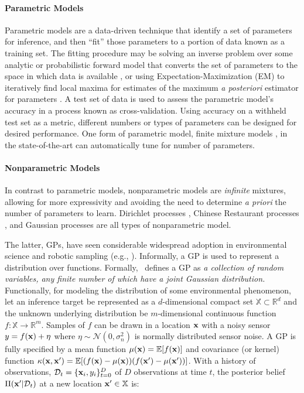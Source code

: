 \paragraph{Parametric Models}
Parametric models are a data-driven technique that identify a set of parameters for inference, and then ``fit'' those parameters to a portion of data known as a training set. The fitting procedure may be solving an inverse problem over some analytic or probabilistic forward model that converts the set of parameters to the space in which data is available \autocite{puonti2016fast}, or using Expectation-Maximization (EM) to iteratively find local maxima for estimates of the maximum \emph{a posteriori} estimator for parameters \autocite{moon1996expectation}. A test set of data is used to assess the parametric model's accuracy in a process known as cross-validation. Using accuracy on a withheld test set as a metric, different numbers or types of parameters can be designed for desired performance. One form of parametric model, finite mixture models \autocite{figueiredo2002unsupervised}, in the state-of-the-art can automatically tune for number of parameters.

\paragraph{Nonparametric Models}
In contrast to parametric models, nonparametric models are \emph{infinite} mixtures, allowing for more expressivity and avoiding the need to determine \emph{a priori} the number of parameters to learn. Dirichlet processes \autocite{ferguson1973bayesian}, Chinese Restaurant processes \autocite{griffiths2003hierarchical}, and Gaussian processes \autocite{Rasmussen2004} are all types of nonparametric model. 

The latter, GPs, have seen considerable widespread adoption in environmental science and robotic sampling (e.g., \cite{Srinivas2012,Krause2008,ouyang2014multi,kleiber2012daily,cahill2015modeling,wan2017reduced, ma2017informative, Marchant2014a,flaspohler2019information,luo2018adaptive,guestrin2005near}). Informally, a GP is used to represent a distribution over functions. Formally,~\cite{Rasmussen2004} defines a GP as \emph{a collection of random variables, any finite number of which have a joint Gaussian distribution.} Functionally, for modeling the distribution of some environmental phenomenon, let an inference target be represented as a $d$-dimensional compact set $\mathbb{X} \subset \mathbb{R}^d$ and the unknown underlying distribution be $m$-dimensional continuous function $f : \mathbb{X} \longrightarrow \mathbb{R}^m$. Samples of $f$ can be drawn in a location $\mathbf{x}$ with a noisy sensor $y = f(\mathbf{x}) + \eta$ where $\eta \sim \mathcal{N}(0, \sigma_n^2)$ is normally distributed sensor noise. A GP is fully specified by a mean function $\mu(\mathbf{x}) = \mathbb{E}[f(\mathbf{x})]$ and covariance (or kernel) function $\kappa(\mathbf{x},\mathbf{x}') = \mathbb{E}[(f(\mathbf{x}) - \mu(\mathbf{x}))(f(\mathbf{x}') - \mu(\mathbf{x}'))]$. With a history of observations, $\mathcal{D}_t = \{\mathbf{x}_i, y_i\}_{t=0}^D$ of $D$ observations at time $t$, the posterior belief $\Pi(\mathbf{x}' | \mathcal{D}_t)$ at a new location $\mathbf{x}' \in \mathbb{X}$ is:

